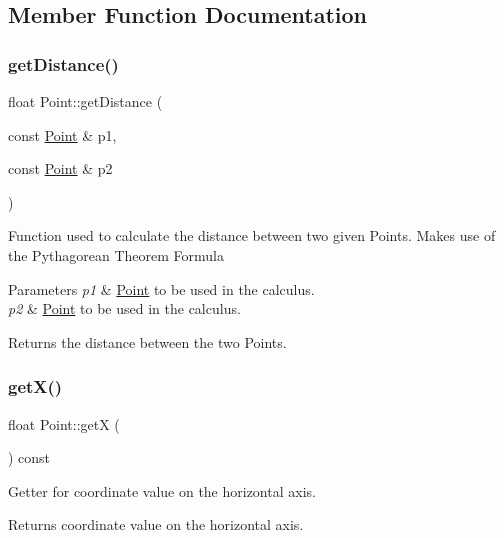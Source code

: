 \subsection{Member Function Documentation}
\hypertarget{class_point_a1dbe2026f242cd96843ea14a67e8a2c3}{}\label{class_point_a1dbe2026f242cd96843ea14a67e8a2c3} 
\subsubsection{\texorpdfstring{get\+Distance()}{getDistance()}}
{\footnotesize\ttfamily float Point\+::get\+Distance (\begin{DoxyParamCaption}\item[{const \hyperlink{class_point}{Point} \&}]{p1,  }\item[{const \hyperlink{class_point}{Point} \&}]{p2 }\end{DoxyParamCaption})\hspace{0.3cm}{\ttfamily [static]}}

Function used to calculate the distance between two given Points. Makes use of the Pythagorean Theorem Formula


\begin{DoxyParams}{Parameters}
{\em p1} & \hyperlink{class_point}{Point} to be used in the calculus. \\
\hline
{\em p2} & \hyperlink{class_point}{Point} to be used in the calculus.\\
\hline
\end{DoxyParams}
\begin{DoxyReturn}{Returns}
the distance between the two Points. 
\end{DoxyReturn}
\hypertarget{class_point_a29c44ec7c7279e02629645a06cdaf7d5}{}\label{class_point_a29c44ec7c7279e02629645a06cdaf7d5} 
\subsubsection{\texorpdfstring{get\+X()}{getX()}}
{\footnotesize\ttfamily float Point\+::getX (\begin{DoxyParamCaption}{ }\end{DoxyParamCaption}) const}

Getter for coordinate value on the horizontal axis.

\begin{DoxyReturn}{Returns}
coordinate value on the horizontal axis. 
\end{DoxyReturn}
\hypertarget{class_point_a2371ffadbe245d12a8f556d0a976521b}{}\label{class_point_a2371ffadbe245d12a8f556d0a976521b} 

